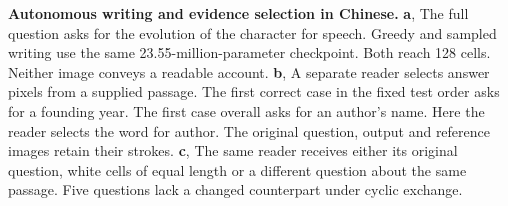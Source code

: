 \textbf{Autonomous writing and evidence selection in Chinese.}
\textbf{a}, The full question asks for the evolution of the character for
speech. Greedy and sampled writing use the same 23.55-million-parameter
checkpoint. Both reach 128 cells. Neither image conveys a readable account.
\textbf{b}, A separate reader selects answer pixels from a supplied passage.
The first correct case in the fixed test order asks for a founding year. The
first case overall asks for an author's name. Here the reader selects the
word for author. The original question, output and reference images retain
their strokes. \textbf{c}, The same reader receives either its original
question, white cells of equal length or a different question about the same
passage. Five questions lack a changed counterpart under cyclic exchange.

